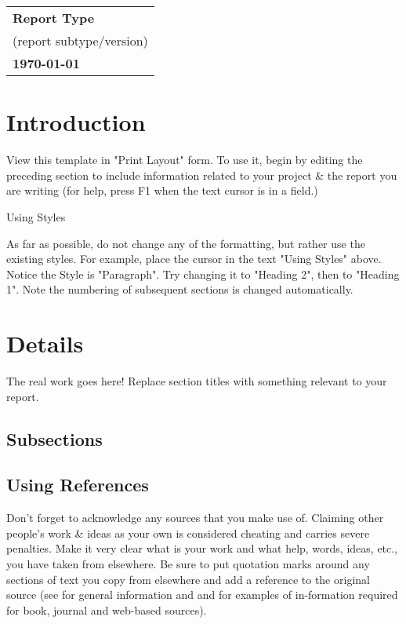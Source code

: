 \documentclass[a4paper, 12pt]{article}
\begin{document}
    \begin{table}[h!]
        \renewcommand{\arraystretch}{1.5}
        \centering
        \begin{tabular}{ |>{\centering\arraybackslash}m{15.15cm}| }
            \hline
            \Large \textbf{Report Type} \\
            \small (report subtype/version) \\
            \small \textbf{\today} \\
            \hline
        \end{tabular}
    \end{table}
    
    
    \section{Introduction}
    
    View this template in "Print Layout" form. To use it, begin by editing 
    the preceding section to include information related to your project \& 
    the report you are writing (for help, press F1 when the text cursor is 
    in a field.) 
    
    Using Styles
    
    As far as possible, do not change any of the formatting, but rather use the 
    existing styles. For example, place the cursor in the text "Using Styles" 
    above. Notice the Style is "Paragraph". Try changing it to "Heading 2", then to 
    "Heading 1". Note the numbering of subsequent sections is changed automatically.
    
    \section{Details}
    
    The real work goes here! Replace section titles with something relevant to your report.
    
    \subsection{Subsections}
    
    \subsection{Using References}
    
    Don’t forget to acknowledge any sources that you make use of. Claiming other 
    people's work \& ideas as your own is considered cheating and carries severe 
    penalties. Make it very clear what is your work and what help, words, ideas, etc., 
    you have taken from elsewhere. Be sure to put quotation marks around any sections 
    of text you copy from elsewhere and add a reference to the original source 
    (see \cite{plagiarism} for general information and \cite{note1} and \cite{note2} for examples of in-formation 
    required for book, journal and web-based sources). 
    
\end{document}
